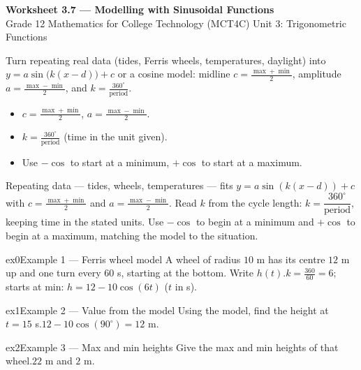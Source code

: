 \documentclass[11pt]{article}
\begin{document}
\begin{center}
{\LARGE\bfseries\color{titleblue}Worksheet 3.7 --- Modelling with Sinusoidal Functions}\\[2pt]
{\small Grade 12 Mathematics for College Technology (MCT4C) \textperiodcentered{} Unit 3: Trigonometric Functions}
\end{center}

\begin{ideabox}
Turn repeating real data (tides, Ferris wheels, temperatures, daylight) into $y=a\sin\!\big(k(x-d)\big)+c$ or a cosine model: midline $c=\tfrac{\max+\min}{2}$, amplitude $a=\tfrac{\max-\min}{2}$, and $k=\tfrac{360^\circ}{\text{period}}$.
\begin{itemize}[leftmargin=*,itemsep=2pt]
  \item $c=\tfrac{\max+\min}{2}$, $a=\tfrac{\max-\min}{2}$.
  \item $k=\tfrac{360^\circ}{\text{period}}$ (time in the unit given).
  \item Use $-\cos$ to start at a minimum, $+\cos$ to start at a maximum.
\end{itemize}
\end{ideabox}

\begin{learnbox}
Repeating data — tides, wheels, temperatures — fits $y=a\sin\!\left(k(x-d)\right)+c$ with $c=\tfrac{\max+\min}{2}$ and $a=\tfrac{\max-\min}{2}$.
Read $k$ from the cycle length: $k=\dfrac{360^\circ}{\text{period}}$, keeping time in the stated units.
Use $-\cos$ to begin at a minimum and $+\cos$ to begin at a maximum, matching the model to the situation.
\end{learnbox}


\begin{example}{ex0}{Example 1 --- Ferris wheel model}
A wheel of radius $10$ m has its centre $12$ m up and one turn every $60$ s, starting at the bottom. Write $h(t)$.\soln $k=\tfrac{360}{60}=6$; starts at min: $h=12-10\cos(6t)$ ($t$ in s).
\end{example}

\begin{example}{ex1}{Example 2 --- Value from the model}
Using the model, find the height at $t=15$ s.\soln $12-10\cos(90^\circ)=12$ m.
\end{example}

\begin{example}{ex2}{Example 3 --- Max and min heights}
Give the max and min heights of that wheel.\soln $22$ m and $2$ m.
\end{example}
\end{document}
